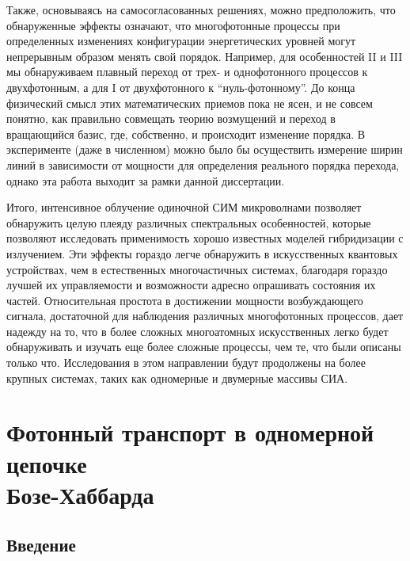 \documentclass[14pt, a4paper]{extreport}
\numberwithin{equation}{section}
\begin{document}
Также, основываясь на самосогласованных решениях, можно предположить, что обнаруженные эффекты означают, что многофотонные процессы при определенных изменениях конфигурации энергетических уровней могут непрерывным образом менять свой порядок. Например, для особенностей II и III мы обнаруживаем плавный переход от трех- и однофотонного процессов к двухфотонным, а для I от двухфотонного к ``нуль-фотонному''. До конца физический смысл этих математических приемов пока не ясен, и не совсем понятно, как правильно совмещать теорию возмущений и переход в вращающийся базис, где, собственно, и происходит изменение порядка. В эксперименте (даже в численном) можно было бы осуществить измерение ширин линий в зависимости от мощности для определения реального порядка перехода, однако эта работа выходит за рамки данной диссертации.

Итого, интенсивное облучение одиночной СИМ микроволнами позволяет обнаружить целую плеяду различных спектральных особенностей, которые позволяют исследовать применимость хорошо известных моделей гибридизации с излучением. Эти эффекты гораздо легче обнаружить в искусственных квантовых устройствах, чем в естественных многочастичных системах, благодаря гораздо лучшей их управляемости и возможности адресно опрашивать состояния их частей. Относительная простота в достижении мощности возбуждающего сигнала, достаточной для наблюдения различных многофотонных процессов, дает надежду на то, что в более сложных многоатомных искусственных легко будет обнаруживать и изучать еще более сложные процессы, чем те, что были описаны только что. Исследования в этом направлении будут продолжены на более крупных системах, таких как одномерные и двумерные массивы СИА.

\chapter{Фотонный транспорт в одномерной цепочке\\ Бозе-Хаббарда}

\section{Введение}
\end{document}
